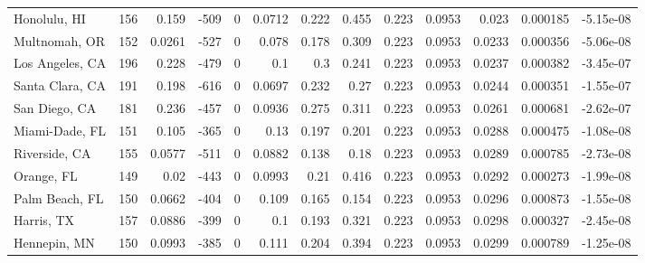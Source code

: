 \documentclass[12pt,letterpaper]{article}
\begin{document}
\begin{appendices}
\begin{sidewaystable}
{\begin{tabular}{lrrrrrrrrrrrr}
 Honolulu, HI       & 156   & 0.159   & -509   &     0 &          0.0712 &           0.222  &         0.455  &              0.223 &             0.0953 &           0.023   &        0.000185 &       -5.15e-08  \\
 Multnomah, OR      & 152   & 0.0261  & -527   &     0 &          0.078  &           0.178  &         0.309  &              0.223 &             0.0953 &           0.0233  &        0.000356 &       -5.06e-08  \\
 Los Angeles, CA    & 196   & 0.228   & -479   &     0 &          0.1    &           0.3    &         0.241  &              0.223 &             0.0953 &           0.0237  &        0.000382 &       -3.45e-07  \\
 Santa Clara, CA    & 191   & 0.198   & -616   &     0 &          0.0697 &           0.232  &         0.27   &              0.223 &             0.0953 &           0.0244  &        0.000351 &       -1.55e-07  \\
 San Diego, CA      & 181   & 0.236   & -457   &     0 &          0.0936 &           0.275  &         0.311  &              0.223 &             0.0953 &           0.0261  &        0.000681 &       -2.62e-07  \\
 Miami-Dade, FL     & 151   & 0.105   & -365   &     0 &          0.13   &           0.197  &         0.201  &              0.223 &             0.0953 &           0.0288  &        0.000475 &       -1.08e-08  \\
 Riverside, CA      & 155   & 0.0577  & -511   &     0 &          0.0882 &           0.138  &         0.18   &              0.223 &             0.0953 &           0.0289  &        0.000785 &       -2.73e-08  \\
 Orange, FL         & 149   & 0.02    & -443   &     0 &          0.0993 &           0.21   &         0.416  &              0.223 &             0.0953 &           0.0292  &        0.000273 &       -1.99e-08  \\
 Palm Beach, FL     & 150   & 0.0662  & -404   &     0 &          0.109  &           0.165  &         0.154  &              0.223 &             0.0953 &           0.0296  &        0.000873 &       -1.55e-08  \\
 Harris, TX         & 157   & 0.0886  & -399   &     0 &          0.1    &           0.193  &         0.321  &              0.223 &             0.0953 &           0.0298  &        0.000327 &       -2.45e-08  \\
 Hennepin, MN       & 150   & 0.0993  & -385   &     0 &          0.111  &           0.204  &         0.394  &              0.223 &             0.0953 &           0.0299  &        0.000789 &       -1.25e-08  \\

\end{tabular}}
\end{sidewaystable}
\end{appendices}
\end{document}
